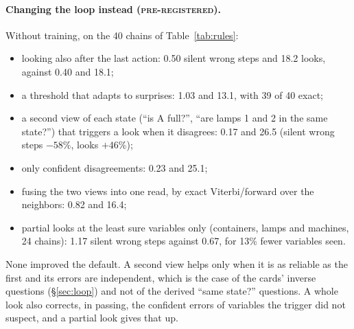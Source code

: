 \documentclass[11pt]{article}
\newcommand{\prereg}{\textsc{pre-registered}}
\begin{document}
\paragraph{Changing the loop instead (\prereg).} Without training, on the 40 chains of Table~\ref{tab:rules}:
\begin{itemize}
  \item looking also after the last action: 0.50 silent wrong steps and 18.2 looks, against 0.40 and 18.1;
  \item a threshold that adapts to surprises: 1.03 and 13.1, with 39 of 40 exact;
  \item a second view of each state (``is A full?'', ``are lamps 1 and 2 in the same state?'') that triggers a look
  when it disagrees: 0.17 and 26.5 (silent wrong steps $-58\%$, looks $+46\%$);
  \item only confident disagreements: 0.23 and 25.1;
  \item fusing the two views into one read, by exact Viterbi/forward over the neighbors: 0.82 and 16.4;
  \item partial looks at the least sure variables only (containers, lamps and machines, 24 chains): 1.17 silent wrong
  steps against 0.67, for 13\% fewer variables seen.
\end{itemize}
None improved the default. A second view helps only when it is as reliable as the first and its errors are independent,
which is the case of the cards' inverse questions (\S\ref{sec:loop}) and not of the derived ``same state?'' questions.
A whole look also corrects, in passing, the confident errors of variables the trigger did not suspect, and a partial
look gives that up.
\end{document}
